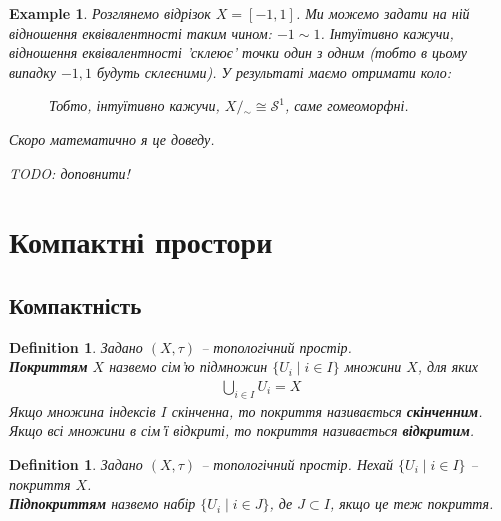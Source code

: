 \documentclass[a4paper, 10pt]{article}
\theoremstyle{theoremdd}
\newtheorem{definition}[theorem]{Definition}
\newtheorem{example}[theorem]{Example}
\begin{document}
\begin{example}
Розглянемо відрізок $X = [-1,1]$. Ми можемо задати на ній відношення еквівалентності таким чином: $-1 \sim 1$. Інтуїтивно кажучи, відношення еквівалентності 'склеює' точки один з одним (тобто в цьому випадку $-1,1$ будуть склеєними). У результаті маємо отримати коло:
\begin{figure}[H]
\centering
{}
\qquad
{}
\caption*{Тобто, інтуїтивно кажучи, $X/{_\sim} \cong \mathcal{S}^1$, саме гомеоморфні.}
\end{figure}
\noindent Скоро математично я це доведу.
\end{example}
\noindent \textit{TODO: доповнити!}

\newpage
\section{Компактні простори}
\subsection{Компактність}
\begin{definition}
Задано $(X,\tau)$ -- топологічний простір.\\
\textbf{Покриттям} $X$ назвемо сім'ю підмножин $\{U_i \mid i \in I\}$ множини $X$, для яких
\begin{align*}
\bigcup_{i \in I} U_i = X
\end{align*}
Якщо множина індексів $I$ скінченна, то покриття називається \textbf{скінченним}. Якщо всі множини в сім'ї відкриті, то покриття називається \textbf{відкритим}.
\end{definition}

\begin{definition}
Задано $(X,\tau)$ -- топологічний простір. Нехай $\{U_i \mid i \in I\}$ -- покриття $X$.\\
\textbf{Підпокриттям} назвемо набір $\{U_i \mid i \in J\}$, де $J \subset I$, якщо це теж покриття.
\end{definition}
\end{document}
